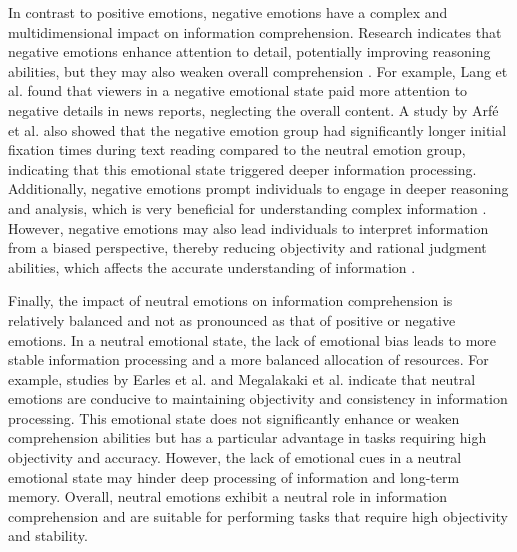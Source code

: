 In contrast to positive emotions, negative emotions have a complex and multidimensional impact on information comprehension. Research indicates that negative emotions enhance attention to detail, potentially improving reasoning abilities, but they may also weaken overall comprehension \cite{egidi2012emotional, lang2007cognition}. For example, Lang et al. \cite{lang2007cognition} found that viewers in a negative emotional state paid more attention to negative details in news reports, neglecting the overall content. A study by Arfé et al. \cite{arfe2023effects} also showed that the negative emotion group had significantly longer initial fixation times during text reading compared to the neutral emotion group, indicating that this emotional state triggered deeper information processing. Additionally, negative emotions prompt individuals to engage in deeper reasoning and analysis, which is very beneficial for understanding complex information \cite{megalakaki2019effects}. However, negative emotions may also lead individuals to interpret information from a biased perspective, thereby reducing objectivity and rational judgment abilities, which affects the accurate understanding of information \cite{tyng2017influences}.

Finally, the impact of neutral emotions on information comprehension is relatively balanced and not as pronounced as that of positive or negative emotions. In a neutral emotional state, the lack of emotional bias leads to more stable information processing and a more balanced allocation of resources. For example, studies by Earles et al. \cite{earles2016memory} and Megalakaki et al. \cite{megalakaki2019effects} indicate that neutral emotions are conducive to maintaining objectivity and consistency in information processing. This emotional state does not significantly enhance or weaken comprehension abilities but has a particular advantage in tasks requiring high objectivity and accuracy. However, the lack of emotional cues in a neutral emotional state may hinder deep processing of information and long-term memory. Overall, neutral emotions exhibit a neutral role in information comprehension and are suitable for performing tasks that require high objectivity and stability.

